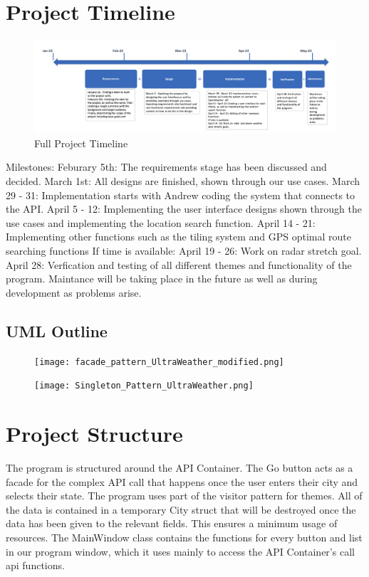 \documentclass[10pt,conference,onecolumn,compsoc]{IEEEtran}
\begin{document}
\section{Project Timeline}
\begin{figure}[ht !]
\includegraphics[scale = 0.3]{Timeline.png}
\caption{Full Project Timeline}
\label{TimeLine}
\end{figure}
Milestones:
Feburary 5th: The requirements stage has been discussed and decided.
March 1st: All designs are finished, shown through our use cases.
March 29 - 31: Implementation starts with Andrew coding the system that connects to the API.
April 5 - 12: Implementing the user interface designs shown through the use cases and implementing the location search function.
April 14 - 21: Implementing other functions such as the tiling system and GPS optimal route searching functions
If time is available:
April 19 - 26: Work on radar stretch goal.
April 28: Verfication and testing of all different themes and functionality of the program.
Maintance will be taking place in the future as well as during development as problems arise.

\subsection{UML Outline}
\begin{figure}[ht!]
\texttt{[image: facade\_pattern\_UltraWeather\_modified.png]}
\end{figure}

\begin{figure}[ht!]
\texttt{[image: Singleton\_Pattern\_UltraWeather.png]}
\end{figure}

\section{Project Structure}
The program is structured around the API Container. The Go button acts as a facade for the complex API call that happens once the user enters their city and selects their state. The program uses part of the visitor pattern for themes. All of the data is contained in a temporary City struct that will be destroyed once the data has been given to the relevant fields. This ensures a minimum usage of resources.
The MainWindow class contains the functions for every button and list in our program window, which it uses mainly to access the API Container's call api functions.
\end{document}

